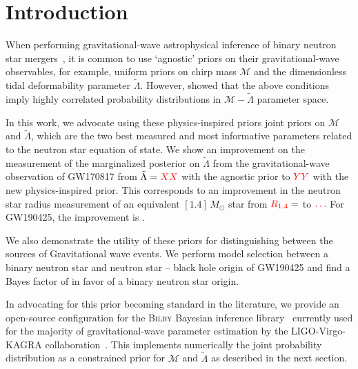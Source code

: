 \documentclass[twocolumn]{aastex631}
\begin{document}
	
	
	\section{Introduction} \label{sec:Intro}
	
	
	
	When performing gravitational-wave astrophysical inference of binary neutron star mergers~\citep[e.g.,][]{abbott17_170817observation,abbott18_170817EOS,abbott19_170817Properties,abbott20_190425}, it is common to use `agnostic' priors on their gravitational-wave observables, for example, uniform priors on chirp mass $\mathcal{M}$ and the dimensionless tidal deformability parameter $\tilde{\Lambda}$. However, \citet{altiparmak22} showed that the above conditions imply highly correlated probability distributions in $\mathcal{M}-\tilde{\Lambda}$ parameter space.
	
In this work, we advocate using these physics-inspired priors joint
priors on $\mathcal{M}$ and $\tilde{\Lambda}$, which are the two best
measured and most informative parameters related to the neutron star
equation of state. We show an improvement on the measurement of the
marginalized posterior on $\tilde{\Lambda}$ from the gravitational-wave
observation of GW170817 from $\tilde{\Lambda}=\textcolor{red}{XX}$ with the agnostic
prior to $\textcolor{red}{YY}$ with the new physics-inspired prior. This corresponds
to an improvement in the neutron star radius measurement of an equivalent
$[1.4]\,{M_\odot}$ star from $\textcolor{red}{R_{1.4}}= $ to $\textcolor{red}{\ldots}$ For
GW190425, the improvement is \red{\ldots}.
	
	We also demonstrate the utility of these priors for distinguishing between the sources of Gravitational wave events. We perform model selection between a binary neutron star and neutron star -- black hole origin of GW190425 and find a Bayes factor of  in favor of a binary neutron star origin. 
	
	In advocating for this prior becoming standard in the literature, we provide an open-source configuration for the \textsc{Bilby} Bayesian inference library~\citep{ashton19,romeroshaw20} currently used for the majority of gravitational-wave parameter estimation by the LIGO-Virgo-KAGRA collaboration~\citep{LIGO, Virgo, KAGRA}. This implements numerically the joint probability distribution as a constrained prior for $\mathcal{M}$ and $\tilde{\Lambda}$ as described in the next section.
	
\end{document}

